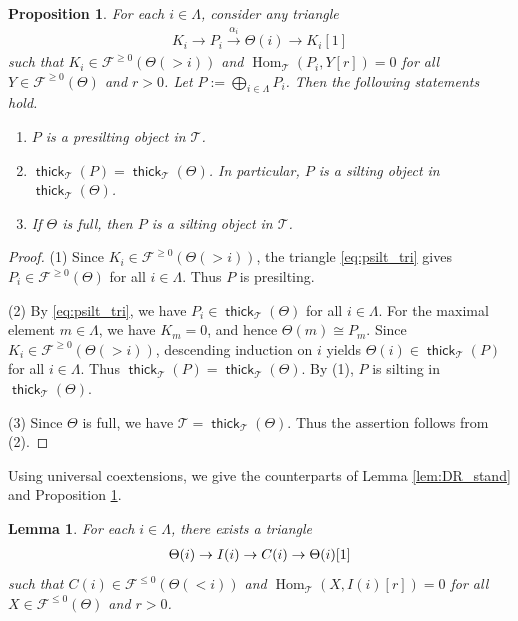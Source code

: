 \documentclass[a4paper,reqno,11pt]{amsart}
\numberwithin{equation}{section}
\newtheorem{lemma}[theorem]{Lemma}
\newtheorem{proposition}[theorem]{Proposition}
\theoremstyle{definition}
\newcommand{\F}{\mathcal{F}}
\newcommand{\T}{\mathcal{T}}
\newcommand{\bte}{\Theta}
\newcommand{\xto}{\xrightarrow}
\DeclareMathOperator{\thick}{\mathsf{thick}}
\DeclareMathOperator{\Hom}{Hom}
\begin{document}
\begin{proposition}\label{prop:const_psilt}
For each $i\in\Lambda$, consider any triangle
\begin{align}\label{eq:psilt_tri}
K_{i}\to P_{i}\xto{\alpha_{i}}\bte(i)\to K_{i}[1]
\end{align}
such that $K_{i}\in\F^{\geq 0}(\bte(>i))$ and $\Hom_{\T}(P_{i},Y[r])=0$ for all $Y\in\F^{\geq 0}(\bte)$ and $r>0$.
Let $P:=\bigoplus_{i\in\Lambda}P_{i}$.
Then the following statements hold.
\begin{enumerate}
\item $P$ is a presilting object in $\T$.
\item $\thick_{\T}(P)=\thick_{\T}(\bte)$. In particular, $P$ is a silting object in $\thick_{\T}(\bte)$.
\item If $\bte$ is full, then $P$ is a silting object in $\T$.
\end{enumerate}
\end{proposition}
\begin{proof}
(1) Since $K_{i}\in\F^{\geq 0}(\bte(>i))$, the triangle \eqref{eq:psilt_tri} gives $P_{i}\in\F^{\geq 0}(\bte)$ for all $i\in\Lambda$.
Thus $P$ is presilting.

(2) By \eqref{eq:psilt_tri}, we have $P_{i}\in\thick_{\T}(\bte)$ for all $i\in\Lambda$.
For the maximal element $m\in\Lambda$, we have $K_{m}=0$, and hence $\bte(m)\cong P_{m}$.
Since $K_{i}\in\F^{\geq 0}(\bte(>i))$, descending induction on $i$ yields $\bte(i)\in\thick_{\T}(P)$ for all $i\in\Lambda$.
Thus $\thick_{\T}(P)=\thick_{\T}(\bte)$.
By (1), $P$ is silting in $\thick_{\T}(\bte)$.

(3) Since $\bte$ is full, we have $\T=\thick_{\T}(\bte)$. 
Thus the assertion follows from (2).
\end{proof}

Using universal coextensions, we give the counterparts of Lemma \ref{lem:DR_stand} and Proposition \ref{prop:const_psilt}.

\begin{lemma}\label{lem:high_univ_coext}
For each $i\in\Lambda$, there exists a triangle
\begin{align}
\bte(i)\to I(i)\to C(i)\to\bte(i)[1]\notag
\end{align}
such that $C(i)\in\F^{\leq 0}(\bte(<i))$ and $\Hom_{\T}(X,I(i)[r])=0$ for all $X\in\F^{\leq 0}(\bte)$ and $r>0$.
\end{lemma}
\end{document}
